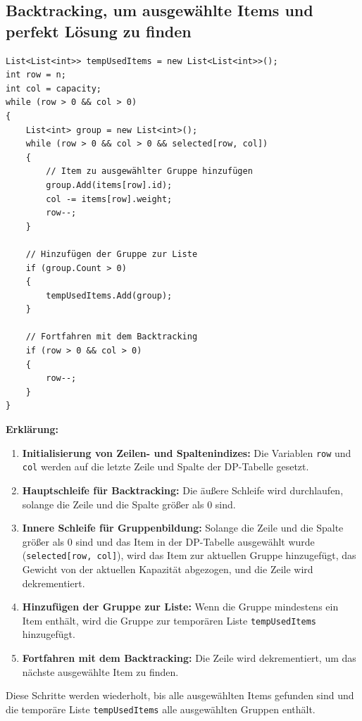 \subsection*{Backtracking, um ausgewählte Items und perfekt Lösung zu finden}
\begin{lstlisting}[style=csharp, caption={}, label=code:backtrack]
List<List<int>> tempUsedItems = new List<List<int>>();
int row = n;
int col = capacity;
while (row > 0 && col > 0)
{
    List<int> group = new List<int>();
    while (row > 0 && col > 0 && selected[row, col])
    {
        // Item zu ausgewählter Gruppe hinzufügen
        group.Add(items[row].id);
        col -= items[row].weight;
        row--;
    }

    // Hinzufügen der Gruppe zur Liste
    if (group.Count > 0)
    {
        tempUsedItems.Add(group);
    }

    // Fortfahren mit dem Backtracking
    if (row > 0 && col > 0)
    {
        row--;
    }
}
\end{lstlisting}

\textbf{Erklärung:}
\begin{enumerate}
    \item \textbf{Initialisierung von Zeilen- und Spaltenindizes:} Die Variablen \texttt{row} und \texttt{col} werden auf die letzte Zeile und Spalte der DP-Tabelle gesetzt.

    \item \textbf{Hauptschleife für Backtracking:} Die äußere Schleife wird durchlaufen, solange die Zeile und die Spalte größer als 0 sind.

    \item \textbf{Innere Schleife für Gruppenbildung:} Solange die Zeile und die Spalte größer als 0 sind und das Item in der DP-Tabelle ausgewählt wurde (\texttt{selected[row, col]}), wird das Item zur aktuellen Gruppe hinzugefügt, das Gewicht von der aktuellen Kapazität abgezogen, und die Zeile wird dekrementiert.

    \item \textbf{Hinzufügen der Gruppe zur Liste:} Wenn die Gruppe mindestens ein Item enthält, wird die Gruppe zur temporären Liste \texttt{tempUsedItems} hinzugefügt.

    \item \textbf{Fortfahren mit dem Backtracking:} Die Zeile wird dekrementiert, um das nächste ausgewählte Item zu finden.
\end{enumerate}

Diese Schritte werden wiederholt, bis alle ausgewählten Items gefunden sind und die temporäre Liste \texttt{tempUsedItems} alle ausgewählten Gruppen enthält.\\

